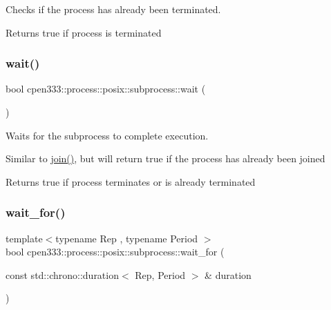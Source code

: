 Checks if the process has already been terminated. 

\begin{DoxyReturn}{Returns}
true if process is terminated 
\end{DoxyReturn}
\mbox{\label{classcpen333_1_1process_1_1posix_1_1subprocess_a8928b9937577c0ec288318b2176156a0}} 
\subsubsection{\texorpdfstring{wait()}{wait()}}
{\footnotesize\ttfamily bool cpen333\+::process\+::posix\+::subprocess\+::wait (\begin{DoxyParamCaption}{ }\end{DoxyParamCaption})\hspace{0.3cm}{\ttfamily [inline]}}



Waits for the subprocess to complete execution. 

Similar to \hyperlink{classcpen333_1_1process_1_1posix_1_1subprocess_af711962e3b6649476bd8cbbd6c59ea8b}{join()}, but will return true if the process has already been joined

\begin{DoxyReturn}{Returns}
true if process terminates or is already terminated 
\end{DoxyReturn}
\mbox{\label{classcpen333_1_1process_1_1posix_1_1subprocess_a1543488d24eaf0f819e81f31d9d388cb}} 
\subsubsection{\texorpdfstring{wait\+\_\+for()}{wait\_for()}}
{\footnotesize\ttfamily template$<$typename Rep , typename Period $>$ \\
bool cpen333\+::process\+::posix\+::subprocess\+::wait\+\_\+for (\begin{DoxyParamCaption}\item[{const std\+::chrono\+::duration$<$ Rep, Period $>$ \&}]{duration }\end{DoxyParamCaption})\hspace{0.3cm}{\ttfamily [inline]}}



